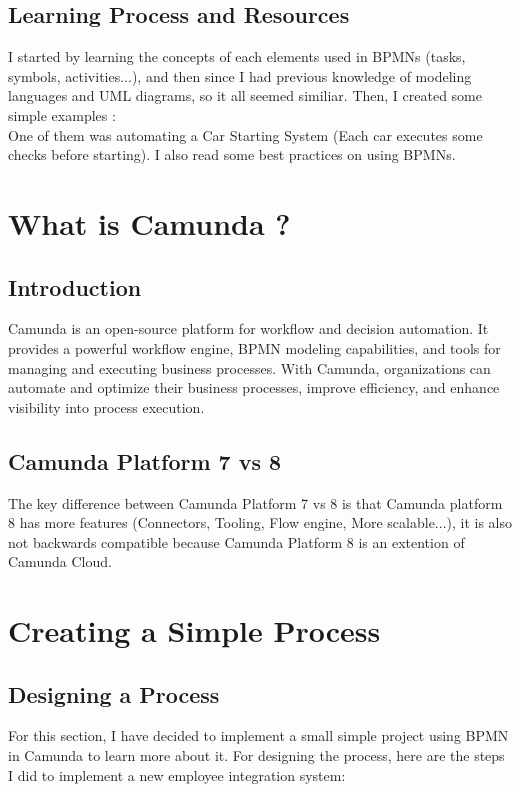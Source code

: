 \documentclass[12pt]{article}
\begin{document}
{  \subsection{Learning Process and Resources}
  I started by learning the concepts of each elements used in BPMNs (tasks, symbols, activities...), and then since I had previous knowledge of modeling languages and UML diagrams, so it all seemed similiar.
  Then, I created some simple examples :
  \\
  One of them was automating a Car Starting System (Each car executes some checks before starting).
  I also read some best practices on using BPMNs.

  \section{What is Camunda ?}

  \subsection{Introduction}

  Camunda is an open-source platform for workflow and decision automation. It provides a powerful workflow engine, BPMN modeling capabilities, and tools for managing and executing business processes. With Camunda, organizations can automate and optimize their business processes, improve efficiency, and enhance visibility into process execution.

  \pagebreak

  \subsection{Camunda Platform 7 vs 8}

  The key difference between Camunda Platform 7 vs 8 is that Camunda platform 8 has more features (Connectors, Tooling, Flow engine, More scalable...), it is also not backwards compatible because Camunda Platform 8 is an extention of Camunda Cloud.

  \section{Creating a Simple Process}

  \subsection{Designing a Process}

  For this section, I have decided to implement a small simple project using BPMN in Camunda to learn more about it.
  For designing the process, here are the steps I did to implement a new employee integration system:

}
\end{document}
